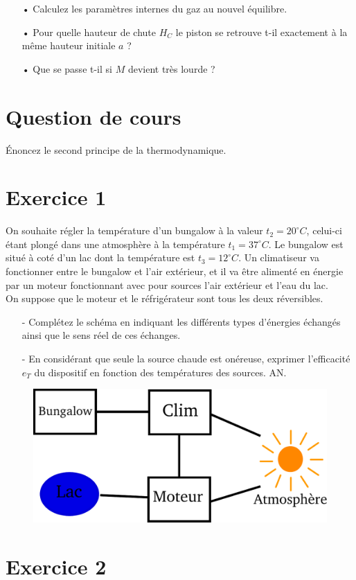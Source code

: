\documentclass{report}
\begin{document}
\begin{itemize}
\item[•] Calculez les paramètres internes du gaz au nouvel équilibre. 
\item[•] Pour quelle hauteur de chute $H_C$ le piston se retrouve t-il exactement à la même hauteur initiale $a$ ?
\item[•] Que se passe t-il si $M$ devient très lourde ?
\end{itemize}

\newpage
\section*{Question de cours}
Énoncez le second principe de la thermodynamique.

\section*{Exercice 1}

On souhaite régler la température d'un bungalow à la valeur $t_{2} = 20^{\circ}C$, celui-ci étant plongé dans une atmosphère à la température $t_{1}=37^{\circ}C$. Le bungalow est situé à coté d'un lac dont la température est $t_{3}=12^{\circ}C$. Un climatiseur va fonctionner entre le bungalow et l'air extérieur, et il va être alimenté en énergie par un moteur fonctionnant avec pour sources l'air extérieur et l'eau du lac.
\\
On suppose que le moteur et le réfrigérateur sont tous les deux réversibles.
\begin{itemize}
\item[-]Complétez le schéma en indiquant les différents types d'énergies échangés ainsi que le sens réel de ces échanges.
\item[-]En considérant que seule la source chaude est onéreuse, exprimer l'efficacité $e_{T}$ du dispositif en fonction des températures des sources. AN.
\end{itemize}
\begin{figure}[!h]
\centering
\includegraphics[width=0.5\linewidth]{bungalow.pdf}
\end{figure}

\section*{Exercice 2}
\end{document}
